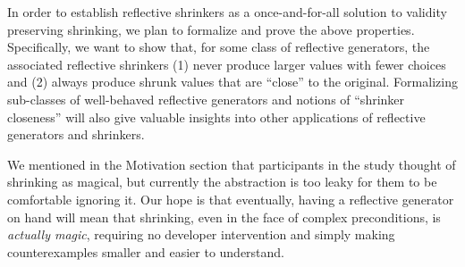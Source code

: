 In order to establish reflective shrinkers as a once-and-for-all solution to
validity preserving shrinking, we plan to formalize and prove the above
properties. Specifically, we want to show that, for some class of reflective
generators, the associated reflective shrinkers (1) never produce larger values
with fewer choices and (2) always produce shrunk values that are ``close'' to
the original. Formalizing sub-classes of well-behaved reflective generators and
notions of ``shrinker closeness'' will also give valuable insights into other
applications of reflective generators and shrinkers.

We mentioned in the Motivation section that participants in the study thought of
shrinking as magical, but currently the abstraction is too leaky for them to
be comfortable ignoring it.  Our hope is that eventually, having a reflective
generator on hand will mean that shrinking, even in the face of complex
preconditions, is {\em actually magic}, requiring no developer intervention and
simply making counterexamples smaller and easier to understand.



